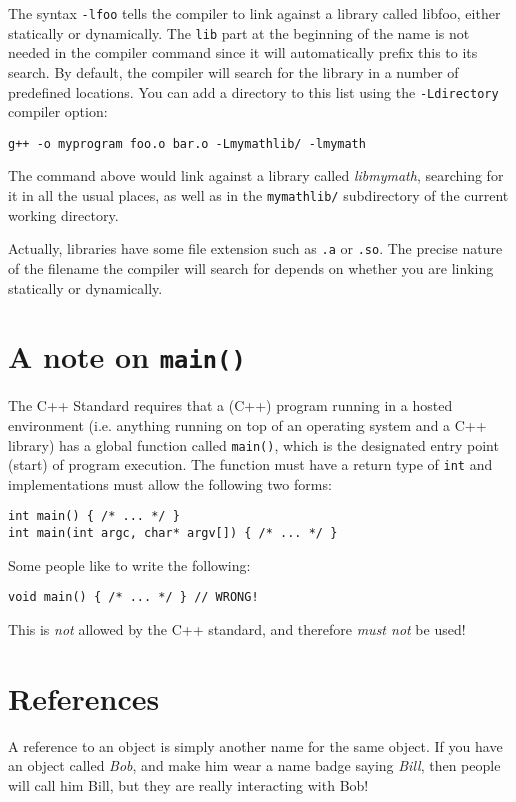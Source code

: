 \documentclass[a4paper]{scrartcl}
\begin{document}
The syntax \verb|-lfoo| tells the compiler to link against a library called libfoo, either statically or dynamically. The \verb|lib| part at the beginning of the name is not needed in the compiler command since it will automatically prefix this to its search. By default, the compiler will search for the library in a number of predefined locations. You can add a directory to this list using the \verb|-Ldirectory| compiler option:

\begin{verbatim}
g++ -o myprogram foo.o bar.o -Lmymathlib/ -lmymath
\end{verbatim}

The command above would link against a library called \emph{libmymath}, searching for it in all the usual places, as well as in the \verb|mymathlib/| subdirectory of the current working directory.

Actually, libraries have some file extension such as \verb|.a| or \verb|.so|. The precise nature of the filename the compiler will search for depends on whether you are linking statically or dynamically.

\section{A note on \texttt{main()}}
The C++ Standard requires that a (C++) program running in a hosted environment (i.e. anything running on top of an operating system and a C++ library) has a global function called \verb|main()|, which is the designated entry point (start) of program execution. The function must have a return type of \verb|int| and implementations must allow the following two forms:

\begin{verbatim}
int main() { /* ... */ }
int main(int argc, char* argv[]) { /* ... */ }
\end{verbatim}

Some people like to write the following:
\begin{verbatim}
void main() { /* ... */ } // WRONG!
\end{verbatim}
This is \emph{not} allowed by the C++ standard, and therefore \emph{must not} be used!

\section{References}
A reference to an object is simply another name for the same object. If you have an object called \emph{Bob}, and make him wear a name badge saying \emph{Bill}, then people will call him Bill, but they are really interacting with Bob!
\end{document}
